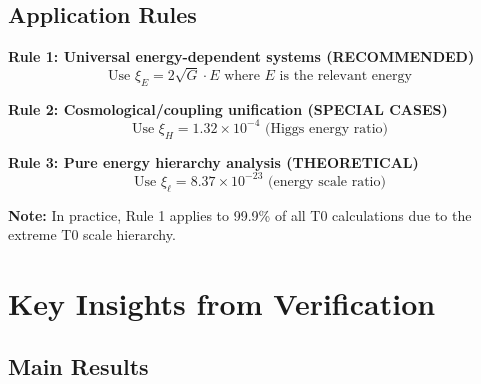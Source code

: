 \documentclass[12pt,a4paper]{article}
\begin{document}
	\subsection{Application Rules}
	
	\begin{tcolorbox}[colback=blue!5!white,colframe=blue!75!black,title=Application Rules for $\xi$ Parameters (Pure Energy)]
		\textbf{Rule 1: Universal energy-dependent systems (RECOMMENDED)}
		\begin{equation}
			\text{Use } \xi_E = 2\sqrt{G} \cdot E \text{ where } E \text{ is the relevant energy}
		\end{equation}
		
		\textbf{Rule 2: Cosmological/coupling unification (SPECIAL CASES)}
		\begin{equation}
			\text{Use } \xi_H = 1.32 \times 10^{-4} \text{ (Higgs energy ratio)}
		\end{equation}
		
		\textbf{Rule 3: Pure energy hierarchy analysis (THEORETICAL)}
		\begin{equation}
			\text{Use } \xi_\ell = 8.37 \times 10^{-23} \text{ (energy scale ratio)}
		\end{equation}
		
		\textbf{Note:} In practice, Rule 1 applies to 99.9\% of all T0 calculations due to the extreme T0 scale hierarchy.
	\end{tcolorbox}
	
	\section{Key Insights from Verification}
	
	\subsection{Main Results}
	
\end{document}
